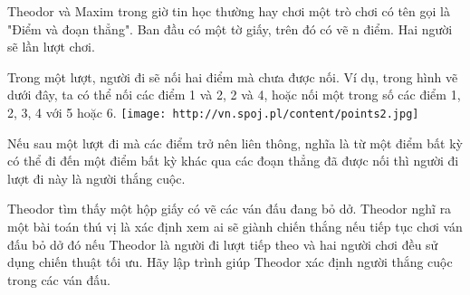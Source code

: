 Theodor và Maxim trong giờ tin học thường hay chơi một trò chơi có tên gọi là "Điểm và đoạn thẳng". Ban đầu có một tờ giấy, trên đó có vẽ n điểm. Hai người sẽ lần lượt chơi.  

   Trong một lượt, người đi sẽ nối hai điểm mà chưa được nối. Ví dụ, trong hình vẽ dưới đây, ta có thể nối các điểm 1 và 2, 2 và 4, hoặc nối một trong số các điểm 1, 2, 3, 4 với 5 hoặc 6.  
\texttt{[image: http://vn.spoj.pl/content/points2.jpg]}

   Nếu sau một lượt đi mà các điểm trở nên liên thông, nghĩa là từ một điểm bất kỳ có thể đi đến một điểm bất kỳ khác qua các đoạn thẳng đã được nối thì người đi lượt đi này là người thắng cuộc.  

   Theodor tìm thấy một hộp giấy có vẽ các ván đấu đang bỏ dở. Theodor nghĩ ra một bài toán thú vị là xác định xem ai sẽ giành chiến thắng nếu tiếp tục chơi ván đấu bỏ dở đó nếu Theodor là người đi lượt tiếp theo và hai người chơi đều sử dụng chiến thuật tối ưu. Hãy lập trình giúp Theodor xác định người thắng cuộc trong các ván đấu.  

\